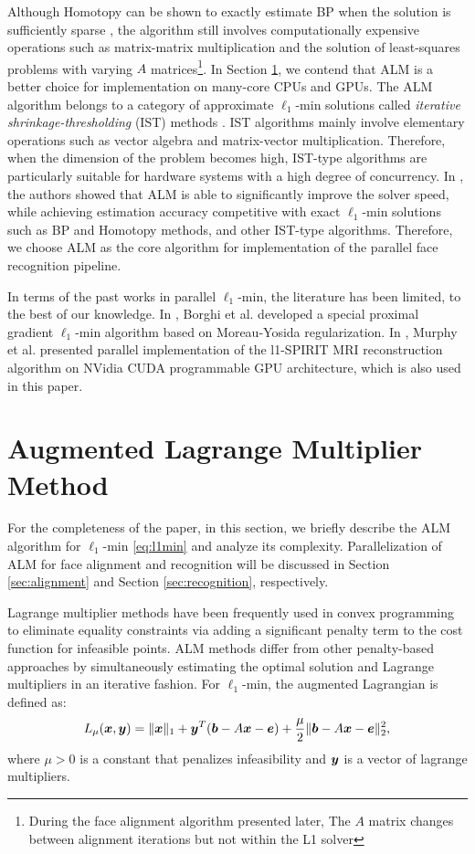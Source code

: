 \documentclass[10pt,twocolumn,letterpaper]{article}
\begin{document}
Although Homotopy can be shown to exactly estimate BP when the solution is
sufficiently sparse \cite{DonohoD2006}, the algorithm still involves
computationally expensive operations such as matrix-matrix multiplication and
the solution of least-squares problems with varying $A$
matrices\footnote{During the face alignment algorithm presented later, The $A$
matrix changes between alignment iterations but not within the L1 solver}.  In
Section \ref{sec:ALM}, we contend that ALM is a better choice for
implementation on many-core CPUs and GPUs. The ALM algorithm belongs to a
category of approximate $\ell_1$-min solutions called \emph{iterative
shrinkage-thresholding} (IST) methods \cite{WrightS2008,BeckA2009}.  IST
algorithms mainly involve elementary operations such as vector algebra and
matrix-vector multiplication. Therefore, when the dimension of the problem
becomes high, IST-type algorithms are particularly suitable for hardware
systems with a high degree of concurrency. In \cite{YangA2010-ICIP}, the
authors showed that ALM is able to significantly improve the solver speed,
while achieving estimation accuracy competitive with exact $\ell_1$-min
solutions such as BP and Homotopy methods, and other IST-type
algorithms.  Therefore, we choose ALM as the core algorithm for
implementation of the parallel face recognition pipeline.

In terms of the past works in parallel $\ell_1$-min, the literature has been
limited, to the best of our knowledge. In \cite{BorghiA2010}, Borghi et al.
developed a special proximal gradient $\ell_1$-min algorithm based on
Moreau-Yosida regularization. In \cite{MurphyM2010}, Murphy et al. presented
parallel implementation of the l1-SPIRIT MRI reconstruction algorithm on NVidia
CUDA programmable GPU architecture, which is also used in this paper.

\section{Augmented Lagrange Multiplier Method}
\label{sec:ALM}

For the completeness of the paper, in this section, we briefly describe the ALM
algorithm for $\ell_1$-min \eqref{eq:l1min} \cite{YangA2010-ICIP} and analyze
its complexity. Parallelization of ALM for face alignment and recognition will
be discussed in Section \ref{sec:alignment} and Section \ref{sec:recognition},
respectively.

Lagrange multiplier methods have been frequently used in convex programming to
eliminate equality constraints via adding a significant penalty term to the
cost function for infeasible points. ALM methods differ from other
penalty-based approaches by simultaneously estimating the optimal solution and
Lagrange multipliers in an iterative fashion.  For $\ell_1$-min, the augmented
Lagrangian is defined as: \begin{equation} L_\mu({\boldsymbol{x}},{\boldsymbol{y}}) = \|{\boldsymbol{x}}\|_1 +
{\boldsymbol{y}}^T({\boldsymbol{b}} - A{\boldsymbol{x}} - {\boldsymbol{e}}) + \frac{\mu}{2} \| {\boldsymbol{b}}-A{\boldsymbol{x}}-{\boldsymbol{e}} \|_2^2, \end{equation}
where $\mu > 0$ is a constant that penalizes infeasibility and ${\boldsymbol{y}}$ is a
vector of lagrange multipliers.
\end{document}
